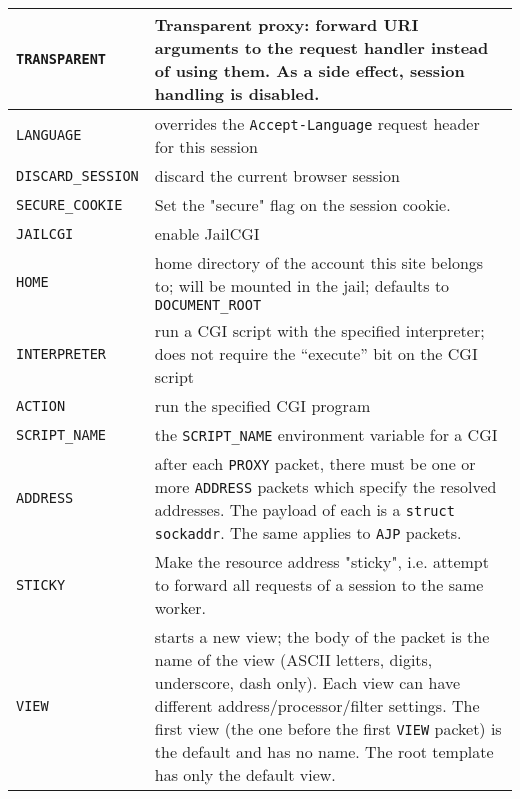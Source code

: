 \documentclass[a4paper,12pt]{article}
\begin{document}
\begin{longtable}{|l|p{8cm}|}
\hline

\verb|TRANSPARENT| & Transparent proxy: forward URI arguments to the
request handler instead of using them.  As a side effect, session
handling is disabled. \\

\hline

\verb|LANGUAGE| & overrides the \texttt{Accept-Language} request
header for this session \\
\hline

\verb|DISCARD_SESSION| & discard the current browser session \\

\hline

\verb|SECURE_COOKIE| & Set the "secure" flag on the session cookie. \\

\hline

\verb|JAILCGI| & enable JailCGI \\

\hline

\verb|HOME| & home directory of the account this site belongs to;
will be mounted in the jail; defaults to \verb|DOCUMENT_ROOT| \\

\hline

\verb|INTERPRETER| & run a CGI script with the specified
interpreter; does not require the ``execute'' bit on the CGI script \\

\hline

\verb|ACTION| & run the specified CGI program \\

\hline

\verb|SCRIPT_NAME| & the \verb|SCRIPT_NAME| environment variable
for a CGI \\

\hline

\verb|ADDRESS| & after each \verb|PROXY| packet, there must be one
or more \verb|ADDRESS| packets which specify the resolved addresses.
The payload of each is a \texttt{struct sockaddr}.
The same applies to \verb|AJP| packets. \\

\hline

\verb|STICKY| & Make the resource address "sticky", i.e. attempt to
forward all requests of a session to the same worker. \\

\hline

\verb|VIEW| & starts a new view; the body of the packet is the name
of the view (ASCII letters, digits, underscore, dash only).  Each view
can have different address/processor/filter settings.  The first view
(the one before the first \verb|VIEW| packet) is the default and has
no name.  The root template has only the default view. \\


\end{longtable}
\end{document}
